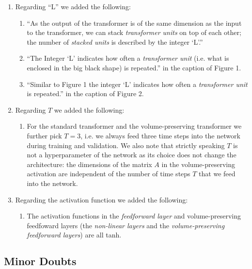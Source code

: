 \documentclass{article}
\begin{document}
\begin{enumerate}
    {
        \color{mred}

    \begin{enumerate}
        \item Regarding ``L'' we added the following: 
            \begin{enumerate}
                \item ``As the output of the transformer is of the same dimension as the input to the transformer, we can stack \textit{transformer units} on top of each other; the number of \textit{stacked units} is described by the integer `L'.''
                \item ``The Integer `L' indicates how often a \textit{transformer unit} (i.e. what is enclosed in the big black shape) is repeated.'' in the caption of Figure 1.
                \item  ``Similar to Figure 1 the integer `L' indicates how often a \textit{transformer unit} is repeated.'' in the caption of Figure 2.
            \end{enumerate}
        \item Regarding $T$ we added the following:
            \begin{enumerate}
                \item For the standard transformer and the volume-preserving transformer we further pick $T = 3$, i.e. we always feed three time steps into the network during training and validation. We also note that strictly speaking $T$ is not a hyperparameter of the network as its choice does not change the architecture: the dimensions of the matrix $A$ in the volume-preserving activation are independent of the number of time steps $T$ that we feed into the network.
            \end{enumerate}
        \item Regarding the activation function we added the following:
            \begin{enumerate}
                \item The activation functions in the \textit{feedforward layer} and volume-preserving feedfoward layers (the \textit{non-linear layers} and the \textit{volume-preserving feedforward layers}) are all tanh.
            \end{enumerate}
    \end{enumerate}

    }
\end{enumerate}

\subsection*{Minor Doubts}
\end{document}
